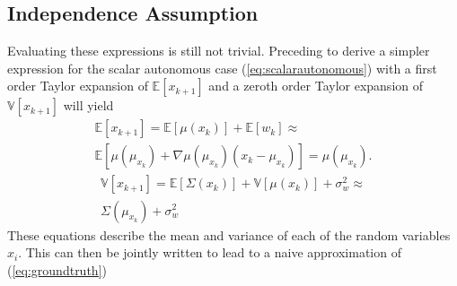     \subsection{Independence Assumption}
        Evaluating these expressions is still not trivial. Preceding to derive a simpler expression for the scalar autonomous case  (\ref{eq:scalarautonomous}) with a first order Taylor expansion of $\mathbb{E}\left[ x_{k+1}\right ]$ and a zeroth order Taylor expansion of $ \mathbb{V}\left[ x_{k+1} \right ]$
        will yield 
        \begin{equation}
        \label{meantaylorexpofgaussianapprox}
        \begin{split}
            \mathbb{E}\left[ 
            x_{k+1}
            \right ]
            =
            \mathbb{E}\left[ 
            \mu(x_{k})
            \right ]
            +
            \mathbb{E}\left[ 
            w_k
            \right ]
            \approx \\
            \mathbb{E}\left[ 
            \mu(\mu_{x_k})+\nabla \mu(\mu_{x_k})(x_k-\mu_{x_k})
            \right ]
            =
            \mu(\mu_{x_k}).
        \end{split}
        \end{equation}
        \begin{equation}
        \label{variancetaylorexpofgaussianapprox}
        \begin{split}
            \mathbb{V}\left[ 
            x_{k+1}
            \right ]
            =
            \mathbb{E}\left[ 
            \Sigma(x_k)
            \right ]
            +
            \mathbb{V}\left[ 
            \mu(x_k)
            \right ]
            + \sigma_w^2
            \approx \\
            \Sigma(\mu_{x_k})+\sigma_w^2
        \end{split}
        \end{equation}
        These equations describe the mean and variance of each of the random variables $x_i$. This can then be jointly written to lead to a naive approximation of (\ref{eq:groundtruth})
